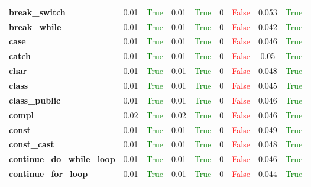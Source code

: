 \documentclass{article}
\begin{document}
\begin{xltabular}{\textwidth}{lcccccccc}
\textbf{{\fontsize{10}{12}\selectfont break\_switch}}& 0.01&\textcolor{green}{True}& 0.01&\textcolor{green}{True}& 0&\textcolor{red}{False}& 0.053&\textcolor{green}{True} \\[0.5ex]
\textbf{{\fontsize{10}{12}\selectfont break\_while}}& 0.01&\textcolor{green}{True}& 0.01&\textcolor{green}{True}& 0&\textcolor{red}{False}& 0.042&\textcolor{green}{True} \\[0.5ex]
\textbf{{\fontsize{10}{12}\selectfont case}}& 0.01&\textcolor{green}{True}& 0.01&\textcolor{green}{True}& 0&\textcolor{red}{False}& 0.046&\textcolor{green}{True} \\[0.5ex]
\textbf{{\fontsize{10}{12}\selectfont catch}}& 0.01&\textcolor{green}{True}& 0.01&\textcolor{green}{True}& 0&\textcolor{red}{False}& 0.05&\textcolor{green}{True} \\[0.5ex]
\textbf{{\fontsize{10}{12}\selectfont char}}& 0.01&\textcolor{green}{True}& 0.01&\textcolor{green}{True}& 0&\textcolor{red}{False}& 0.048&\textcolor{green}{True} \\[0.5ex]
\textbf{{\fontsize{10}{12}\selectfont class}}& 0.01&\textcolor{green}{True}& 0.01&\textcolor{green}{True}& 0&\textcolor{red}{False}& 0.045&\textcolor{green}{True} \\[0.5ex]
\textbf{{\fontsize{10}{12}\selectfont class\_public}}& 0.01&\textcolor{green}{True}& 0.01&\textcolor{green}{True}& 0&\textcolor{red}{False}& 0.046&\textcolor{green}{True} \\[0.5ex]
\textbf{{\fontsize{10}{12}\selectfont compl}}& 0.02&\textcolor{green}{True}& 0.02&\textcolor{green}{True}& 0&\textcolor{red}{False}& 0.046&\textcolor{green}{True} \\[0.5ex]
\textbf{{\fontsize{10}{12}\selectfont const}}& 0.01&\textcolor{green}{True}& 0.01&\textcolor{green}{True}& 0&\textcolor{red}{False}& 0.049&\textcolor{green}{True} \\[0.5ex]
\textbf{{\fontsize{10}{12}\selectfont const\_cast}}& 0.01&\textcolor{green}{True}& 0.01&\textcolor{green}{True}& 0&\textcolor{red}{False}& 0.048&\textcolor{green}{True} \\[0.5ex]
\textbf{{\fontsize{10}{12}\selectfont continue\_do\_while\_loop}}& 0.01&\textcolor{green}{True}& 0.01&\textcolor{green}{True}& 0&\textcolor{red}{False}& 0.046&\textcolor{green}{True} \\[0.5ex]
\textbf{{\fontsize{10}{12}\selectfont continue\_for\_loop}}& 0.01&\textcolor{green}{True}& 0.01&\textcolor{green}{True}& 0&\textcolor{red}{False}& 0.044&\textcolor{green}{True} \\[0.5ex]

\end{xltabular}
\end{document}
